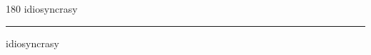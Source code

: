 
\begin{frame}
\begin{center}
\begin{turn}{180}
{\fontsize{2.5cm}{1em}\selectfont idiosyncrasy}
\end{turn}
\vspace{1em}\par  
\hrule
\vspace{1em}\par  
{\fontsize{2.5cm}{1em}\selectfont idiosyncrasy}
\end{center}
\end{frame}
